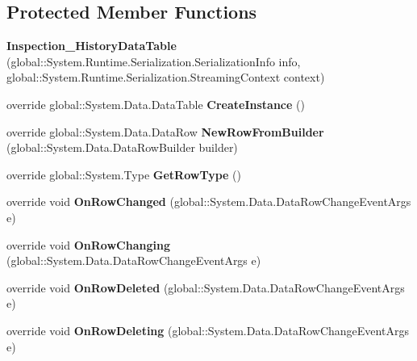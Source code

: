 \subsection*{Protected Member Functions}
\begin{DoxyCompactItemize}
\item 
\mbox{\label{class_a_f_h___scheduler_1_1_home_inspection_db_data_set_1_1_inspection___history_data_table_a083d5eaaf16f95a98fb5e4adaa486cfd}} 
{\bfseries Inspection\+\_\+\+History\+Data\+Table} (global\+::\+System.\+Runtime.\+Serialization.\+Serialization\+Info info, global\+::\+System.\+Runtime.\+Serialization.\+Streaming\+Context context)
\item 
\mbox{\label{class_a_f_h___scheduler_1_1_home_inspection_db_data_set_1_1_inspection___history_data_table_abacc36a8c459bbcc88790ffbc07a89e5}} 
override global\+::\+System.\+Data.\+Data\+Table {\bfseries Create\+Instance} ()
\item 
\mbox{\label{class_a_f_h___scheduler_1_1_home_inspection_db_data_set_1_1_inspection___history_data_table_aa1eab16b269b2bcf23a495f5dc37d454}} 
override global\+::\+System.\+Data.\+Data\+Row {\bfseries New\+Row\+From\+Builder} (global\+::\+System.\+Data.\+Data\+Row\+Builder builder)
\item 
\mbox{\label{class_a_f_h___scheduler_1_1_home_inspection_db_data_set_1_1_inspection___history_data_table_a66ed0c6c46a1f7cc800e05014a84b257}} 
override global\+::\+System.\+Type {\bfseries Get\+Row\+Type} ()
\item 
\mbox{\label{class_a_f_h___scheduler_1_1_home_inspection_db_data_set_1_1_inspection___history_data_table_a01e7bf85178cb20b8fedc017d4f1c6b0}} 
override void {\bfseries On\+Row\+Changed} (global\+::\+System.\+Data.\+Data\+Row\+Change\+Event\+Args e)
\item 
\mbox{\label{class_a_f_h___scheduler_1_1_home_inspection_db_data_set_1_1_inspection___history_data_table_aa28e01a30189b901fecbc3ad0b2ca0e2}} 
override void {\bfseries On\+Row\+Changing} (global\+::\+System.\+Data.\+Data\+Row\+Change\+Event\+Args e)
\item 
\mbox{\label{class_a_f_h___scheduler_1_1_home_inspection_db_data_set_1_1_inspection___history_data_table_a1c127f684d8de500406bad74900dd0fc}} 
override void {\bfseries On\+Row\+Deleted} (global\+::\+System.\+Data.\+Data\+Row\+Change\+Event\+Args e)
\item 
\mbox{\label{class_a_f_h___scheduler_1_1_home_inspection_db_data_set_1_1_inspection___history_data_table_aae363e59fcd9c22dc4663fef46c8bfb6}} 
override void {\bfseries On\+Row\+Deleting} (global\+::\+System.\+Data.\+Data\+Row\+Change\+Event\+Args e)
\end{DoxyCompactItemize}
